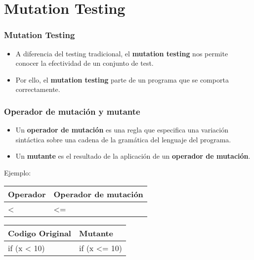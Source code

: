 \documentclass{beamer}
\begin{document}
\section{Mutation Testing}

\begin{frame}
	\frametitle{Mutation Testing}
	\begin{itemize}
	\item A diferencia del testing tradicional, el \textbf{mutation testing} nos permite conocer la efectividad de un conjunto de test.
	\item Por ello, el \textbf{mutation testing} parte de un programa que se comporta correctamente.
	\end{itemize}
\end{frame}

\begin{frame}
	\frametitle{Operador de mutación y mutante}
	\begin{itemize}
	\item Un \textbf{operador de mutación} es una regla que especifica una variación sintáctica sobre una cadena de la gramática del lenguaje del programa.
	\item Un \textbf{mutante} es el resultado de la aplicación de un \textbf{operador de mutación}.
	\end{itemize}
	Ejemplo: 
	\begin{table}[]
		\begin{tabular}{|l|l|}
		\hline
		Operador    & Operador de mutación  \\ \hline
		\textless{} & \textless{}=           \\ \hline
		\end{tabular}
	\end{table}
	
	\begin{table}[]
		\begin{tabular}{|l|l|}
		\hline
		Codigo Original     & Mutante                 \\ \hline
		if (x \textless{} 10) & if (x \textless{}= 10)  \\ \hline
		\end{tabular}
	\end{table}
	
\end{frame}
	
\end{document}
